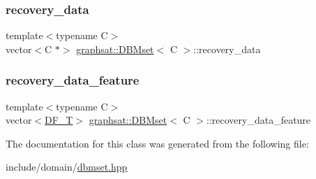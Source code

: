 \mbox{\label{classgraphsat_1_1_d_b_mset_adfd9208fe16d211f33977c3d83d17342}} 
\subsubsection{\texorpdfstring{recovery\_data}{recovery\_data}}
{\footnotesize\ttfamily template$<$typename C$>$ \\
vector$<$C $\ast$$>$ \mbox{\hyperlink{classgraphsat_1_1_d_b_mset}{graphsat\+::\+D\+B\+Mset}}$<$ C $>$\+::recovery\+\_\+data\hspace{0.3cm}{\ttfamily [private]}}

\mbox{\label{classgraphsat_1_1_d_b_mset_a005bc0a422afaa2e6b742264345f1972}} 
\subsubsection{\texorpdfstring{recovery\_data\_feature}{recovery\_data\_feature}}
{\footnotesize\ttfamily template$<$typename C$>$ \\
vector$<$\mbox{\hyperlink{namespacegraphsat_a9d75165dd4e82d2e03ffd07fe27533d0}{D\+F\+\_\+T}}$>$ \mbox{\hyperlink{classgraphsat_1_1_d_b_mset}{graphsat\+::\+D\+B\+Mset}}$<$ C $>$\+::recovery\+\_\+data\+\_\+feature\hspace{0.3cm}{\ttfamily [private]}}



The documentation for this class was generated from the following file\+:\begin{DoxyCompactItemize}
\item 
include/domain/\mbox{\hyperlink{dbmset_8hpp}{dbmset.\+hpp}}\end{DoxyCompactItemize}
